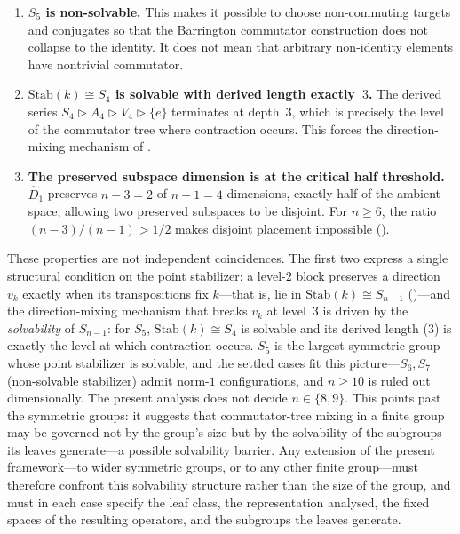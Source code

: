 \documentclass[version=final]{iacrcc}
\newcommand{\Dhat}{\widehat{D}}
\begin{document}
\begin{enumerate}[nosep]
\item \textbf{$S_5$ is non-solvable.} This makes it possible to choose
  non-commuting targets and conjugates so that the Barrington commutator
  construction does not collapse to the identity. It does not mean that
  arbitrary non-identity elements have nontrivial commutator.
\item \textbf{$\mathrm{Stab}(k) \cong S_4$ is solvable with derived length
  exactly~$3$.} The derived series
  $S_4 \rhd A_4 \rhd V_4 \rhd \{e\}$ terminates at depth~$3$, which is
  precisely the level of the commutator tree where contraction occurs.
  This forces the direction-mixing mechanism of .
\item \textbf{The preserved subspace dimension is at the critical half
  threshold.} $\Dhat_1$ preserves $n-3 = 2$ of $n-1 = 4$
  dimensions, exactly half of the ambient space, allowing two preserved
  subspaces to be disjoint. For $n \geq 6$, the ratio
  $(n-3)/(n-1) > 1/2$ makes disjoint placement impossible
  ().
\end{enumerate}

These properties are not independent coincidences. The first two express a
single structural condition on the point stabilizer: a level-$2$ block preserves
a direction $v_k$ exactly when its transpositions fix $k$---that is, lie in
$\mathrm{Stab}(k) \cong S_{n-1}$ ()---and the direction-mixing
mechanism that breaks $v_k$ at level~$3$ is driven by the \emph{solvability} of
$S_{n-1}$: for $S_5$, $\mathrm{Stab}(k) \cong S_4$ is solvable and its derived
length ($3$) is exactly the level at which contraction occurs. $S_5$ is the
largest symmetric group whose point stabilizer is solvable, and the settled cases
fit this picture---$S_6, S_7$ (non-solvable stabilizer) admit norm-$1$
configurations, and $n \geq 10$ is ruled out dimensionally. The present
analysis does not decide $n \in \{8,9\}$. This
points past the symmetric groups: it suggests that commutator-tree mixing in a
finite group may be governed not by the group's size but by the solvability of
the subgroups its leaves generate---a possible solvability barrier. Any extension
of the present framework---to wider symmetric groups, or to
any other finite group---must therefore confront this solvability structure
rather than the size of the group, and must in each case specify the leaf class,
the representation analysed, the fixed spaces of the resulting operators, and
the subgroups the leaves generate.
\end{document}
